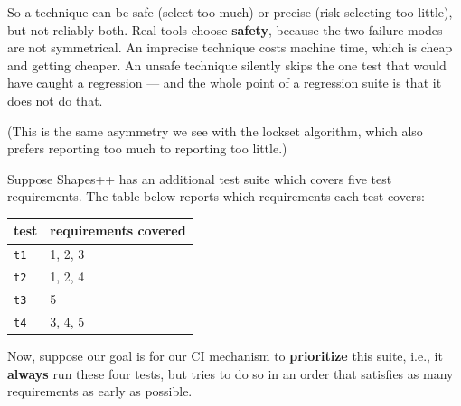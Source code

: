 \documentclass[addpoints]{exam}
\newcommand{\Code}[1]{\texttt{#1}}
\newcommand{\nonAnswerNewPage}{\ifprintanswers \vfill \else \newpage \fi}
\begin{document}
\begin{questions}
\begin{parts}
\begin{solutionorbox}[3in]
    So a technique can be safe (select too much) or precise (risk
    selecting too little), but not reliably both. Real tools choose
    \textbf{safety}, because the two failure modes are not
    symmetrical. An imprecise technique costs machine time, which is
    cheap and getting cheaper. An unsafe technique silently skips the
    one test that would have caught a regression --- and the whole
    point of a regression suite is that it does not do that.

    (This is the same asymmetry we see with the lockset algorithm,
    which also prefers reporting too much to reporting too little.)
  \end{solutionorbox}

\end{parts}

\nonAnswerNewPage

\question Suppose \textsf{Shapes++} has an additional test suite which
  covers five test requirements. The table below reports which
  requirements each test covers:

  \begin{center}
    \begin{tabular}{ll}
      test & requirements covered \\ \hline
      \Code{t1} & 1, 2, 3 \\
      \Code{t2} & 1, 2, 4 \\
      \Code{t3} & 5 \\
      \Code{t4} & 3, 4, 5 \\
    \end{tabular}
  \end{center}

  Now, suppose our goal is for our CI mechanism to \textbf{prioritize}
  this suite, i.e., it \textbf{always} run these four tests, but tries
  to do so in an order that satisfies as many requirements as early as
  possible.

\end{questions}
\end{document}
